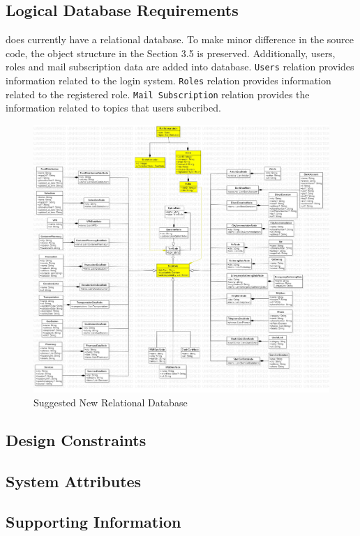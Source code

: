 \subsection{Logical Database Requirements}

\afetbilgi does currently have a relational database. To make minor difference in the source code, the object structure in the Section 3.5 is preserved. Additionally, users, roles and mail subscription data are added into database. \texttt{Users} relation provides information related to the login system. \texttt{Roles} relation provides information related to the registered role. \texttt{Mail Subscription} relation provides the information related to topics that users subcribed.

\begin{figure}[H]
  \centering
  \includegraphics[width=\linewidth]{img/database-s4.jpg}
  \caption{Suggested New Relational Database}
\end{figure}

\subsection{Design Constraints}

\subsection{System Attributes}

\subsection{Supporting Information}

